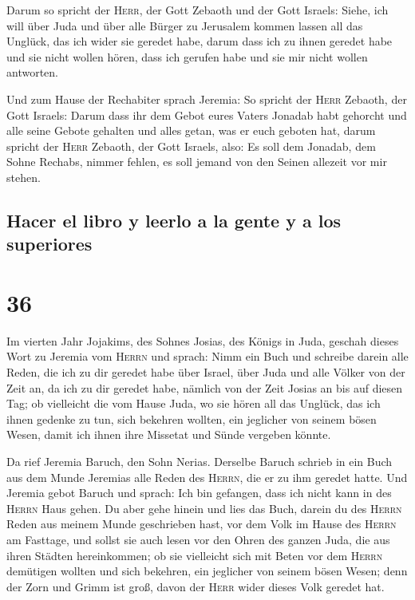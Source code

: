  Darum so spricht der \textsc{Herr}, der Gott Zebaoth und
der Gott Israels: Siehe, ich will über Juda und über alle Bürger zu
Jerusalem kommen lassen all das Unglück, das ich wider sie geredet habe,
darum dass ich zu ihnen geredet habe und sie nicht wollen hören, dass
ich gerufen habe und sie mir nicht wollen antworten.

 Und zum Hause der Rechabiter sprach Jeremia: So spricht
der \textsc{Herr} Zebaoth, der Gott Israels: Darum dass ihr dem Gebot
eures Vaters Jonadab habt gehorcht und alle seine Gebote gehalten und
alles getan, was er euch geboten hat,  darum spricht der
\textsc{Herr} Zebaoth, der Gott Israels, also: Es soll dem Jonadab, dem
Sohne Rechabs, nimmer fehlen, es soll jemand von den Seinen allezeit vor
mir stehen.

\hypertarget{hacer-el-libro-y-leerlo-a-la-gente-y-a-los-superiores}{%
\subsection{Hacer el libro y leerlo a la gente y a los
superiores}\label{hacer-el-libro-y-leerlo-a-la-gente-y-a-los-superiores}}

\hypertarget{section-35}{%
\section{36}\label{section-35}}

 Im vierten Jahr Jojakims, des Sohnes Josias, des Königs
in Juda, geschah dieses Wort zu Jeremia vom \textsc{Herrn} und sprach:
 Nimm ein Buch und schreibe darein alle Reden, die ich zu
dir geredet habe über Israel, über Juda und alle Völker von der Zeit an,
da ich zu dir geredet habe, nämlich von der Zeit Josias an bis auf
diesen Tag;  ob vielleicht die vom Hause Juda, wo sie
hören all das Unglück, das ich ihnen gedenke zu tun, sich bekehren
wollten, ein jeglicher von seinem bösen Wesen, damit ich ihnen ihre
Missetat und Sünde vergeben könnte.

 Da rief Jeremia Baruch, den Sohn Nerias. Derselbe Baruch
schrieb in ein Buch aus dem Munde Jeremias alle Reden des
\textsc{Herrn}, die er zu ihm geredet hatte.  Und Jeremia
gebot Baruch und sprach: Ich bin gefangen, dass ich nicht kann in des
\textsc{Herrn} Haus gehen.  Du aber gehe hinein und lies
das Buch, darein du des \textsc{Herrn} Reden aus meinem Munde
geschrieben hast, vor dem Volk im Hause des \textsc{Herrn} am Fasttage,
und sollst sie auch lesen vor den Ohren des ganzen Juda, die aus ihren
Städten hereinkommen;  ob sie vielleicht sich mit Beten
vor dem \textsc{Herrn} demütigen wollten und sich bekehren, ein
jeglicher von seinem bösen Wesen; denn der Zorn und Grimm ist groß,
davon der \textsc{Herr} wider dieses Volk geredet hat.

